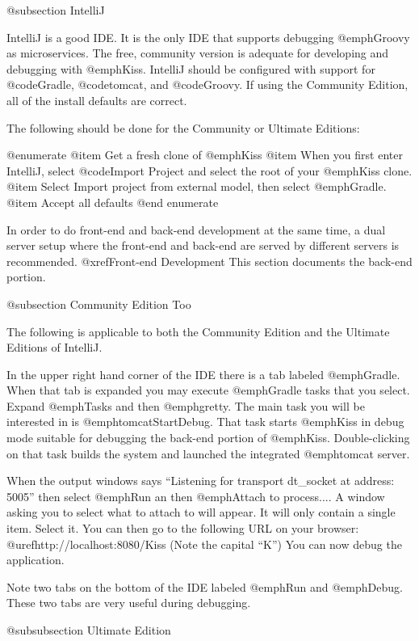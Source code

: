 @subsection IntelliJ

IntelliJ is a good IDE.  It is the only IDE that supports debugging
@emph{Groovy} as microservices.  The free, community version is adequate for developing
and debugging with @emph{Kiss}.  IntelliJ should be configured with
support for @code{Gradle}, @code{tomcat}, and @code{Groovy}.  If using the Community Edition, all of the install defaults are correct. 

The following should be done for the Community or Ultimate Editions:

@enumerate
@item
Get a fresh clone of @emph{Kiss}
@item
When you first enter IntelliJ, select @code{Import Project} and select the root of your @emph{Kiss} clone.
@item
Select Import project from external model, then select @emph{Gradle}.
@item
Accept all defaults
@end enumerate

In order to do front-end and back-end development at the same time, a dual server setup where
the front-end and back-end are served by different servers is recommended.  @xref{Front-end Development}
This section documents the back-end portion.

@subsection Community Edition Too

The following is applicable to both the Community Edition and the Ultimate Editions of IntelliJ.

In the upper right hand corner of the IDE there is a tab labeled @emph{Gradle}.  When that tab is expanded you may execute @emph{Gradle} tasks that you select.
Expand @emph{Tasks} and then @emph{gretty}.  The main task you will be interested in is @emph{tomcatStartDebug}.  That task starts @emph{Kiss}
in debug mode suitable for debugging the back-end portion of @emph{Kiss}.  Double-clicking on that task builds the system and launched the integrated @emph{tomcat}
server.  

When the output windows says ``Listening for transport dt_socket at address: 5005'' then select @emph{Run} an then @emph{Attach to process...}.
A window asking you to select what to attach to will appear.  It will only contain a single item.  Select it. You can then go to the following URL
on your browser:  @uref{http://localhost:8080/Kiss}  (Note the capital ``K'')  You can now debug the application.

Note two tabs on the bottom of the IDE labeled @emph{Run} and @emph{Debug}.  These two tabs are very useful during debugging.



@subsubsection Ultimate Edition

